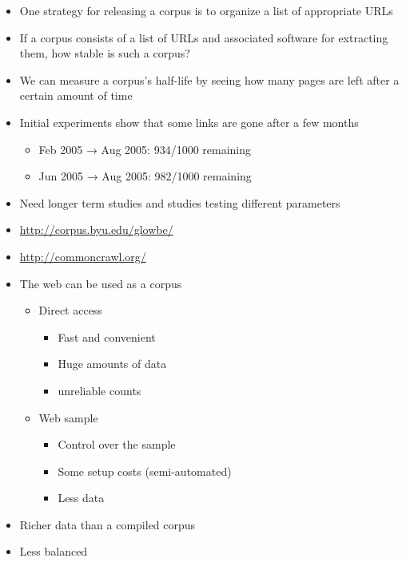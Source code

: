 \documentclass[a4paper,landscape,headrule,footrule,xetex]{foils}
\begin{document}

\begin{itemize}
\item One strategy for releasing a corpus is to organize a list of
appropriate URLs
\item If a corpus consists of a list of URLs and associated
software for extracting them, how stable is such a corpus?
\item 
We can measure a corpus's half-life by seeing how
many pages are left after a certain amount of time
\item Initial experiments show that some links are gone after
a few months
\begin{itemize}
\item Feb 2005 → Aug 2005: 934/1000 remaining
\item Jun 2005 → Aug 2005: 982/1000 remaining
\end{itemize}
\item Need longer term studies and studies testing different
parameters
\end{itemize}




\begin{itemize}
\item \url{http://corpus.byu.edu/glowbe/}
\item \url{http://commoncrawl.org/}
\end{itemize}



\begin{itemize}
\item The web can be used as a corpus
  \begin{itemize}
  \item Direct access
    \begin{itemize}
    \item Fast and convenient
    \item Huge amounts of data
    \item[\Bad] unreliable counts 
    \end{itemize}
  \item Web sample
    \begin{itemize}
    \item Control over the sample
    \item Some setup costs (semi-automated)
    \item[\Bad] Less data 
    \end{itemize}
  \end{itemize}
\item Richer data than a compiled corpus
\item[\Bad] Less balanced
\end{itemize}
\end{document}
